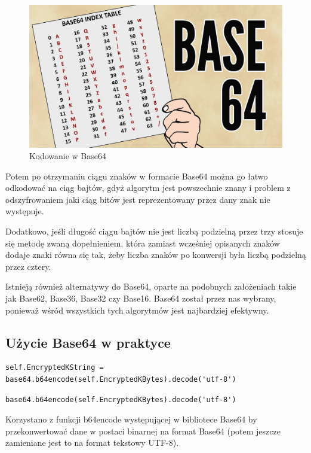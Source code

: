 \begin{figure}[H]
    \centering
    \includegraphics[width=\textwidth]{Images/Base64Coding.jpg}
    \caption{Kodowanie w Base64}
	\label{fig:Base64Coding}
\end{figure}
Potem po otrzymaniu ciągu znaków w formacie Base64 można go łatwo odkodować na ciąg bajtów, gdyż algorytm jest powszechnie znany i problem z odszyfrowaniem jaki ciąg bitów jest reprezentowany przez dany znak nie występuje.

\vspace{1em}

Dodatkowo, jeśli długość ciągu bajtów nie jest liczbą podzielną przez trzy stosuje się metodę zwaną dopełnieniem, która zamiast wcześniej opisanych znaków dodaje znaki równa się tak, żeby liczba znaków po konwersji była liczbą podzielną przez cztery.

\vspace{1em}

Istnieją również alternatywy do Base64, oparte na podobnych założeniach takie jak Base62, Base36, Base32 czy Base16. Base64 został przez nas wybrany, ponieważ wśród wszystkich tych algorytmów jest najbardziej efektywny.
\subsection{Użycie Base64 w praktyce}
\label{chap:Base64Praktyka}
\begin{lstlisting}
self.EncryptedKString = base64.b64encode(self.EncryptedKBytes).decode('utf-8')
\end{lstlisting}
\begin{lstlisting}
base64.b64encode(self.EncryptedKBytes).decode('utf-8')
\end{lstlisting}
Korzystano z funkcji b64encode występującej w bibliotece Base64 by przekonwertować dane w postaci binarnej na format Base64 (potem jeszcze zamieniane jest to na format tekstowy UTF-8).
